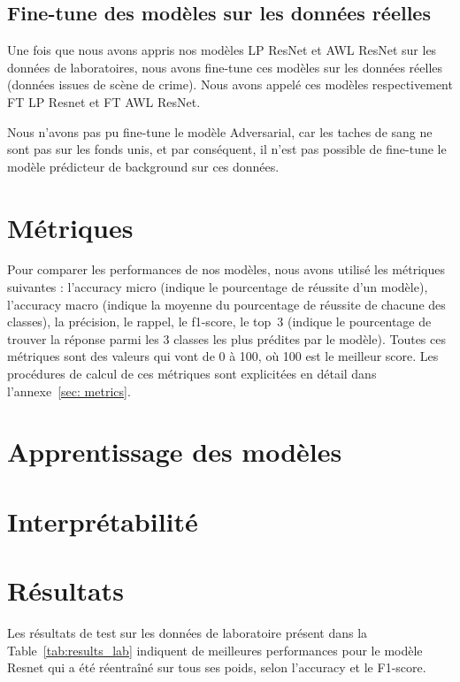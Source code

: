 \documentclass[a4paper]{article}
\begin{document}
\subsection{Fine-tune des modèles sur les données réelles}
Une fois que nous avons appris nos modèles LP ResNet et AWL ResNet sur les données de laboratoires, nous avons fine-tune ces modèles sur les données réelles (données issues de scène de crime). Nous avons appelé ces modèles respectivement FT LP Resnet et FT AWL ResNet.

Nous n'avons pas pu fine-tune le modèle Adversarial, car les taches de sang ne sont pas sur les fonds unis, et par conséquent, il n'est pas possible de fine-tune le modèle prédicteur de background sur ces données.

\section{Métriques}
Pour comparer les performances de nos modèles, nous avons utilisé les métriques suivantes : l'accuracy micro (indique le pourcentage de réussite d'un modèle), l'accuracy macro (indique la moyenne du pourcentage de réussite de chacune des classes), la précision, le rappel, le f1-score, le top~3 (indique le pourcentage de trouver la réponse parmi les 3 classes les plus prédites par le modèle). Toutes ces métriques sont des valeurs qui vont de 0 à 100, où 100 est le meilleur score. 
Les procédures de calcul de ces métriques sont explicitées en détail dans l'annexe~\ref{sec: metrics}.

\section{Apprentissage des modèles}


\section{Interprétabilité}


\section{Résultats}

Les résultats de test sur les données de laboratoire présent dans la Table~\ref{tab:results_lab} indiquent de meilleures performances pour le modèle Resnet qui a été réentraîné sur tous ses poids, selon l'accuracy et le F1-score. 
\end{document}

